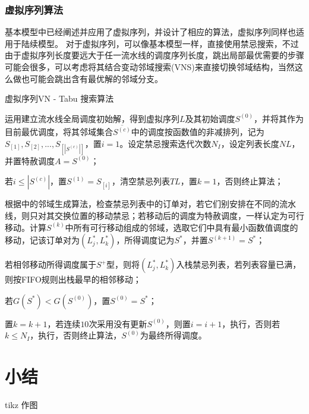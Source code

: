 \subsubsection{虚拟序列算法}
基本模型中已经阐述并应用了虚拟序列，并设计了相应的算法，虚拟序列同样也适用于陆续模型。
对于虚拟序列，可以像基本模型一样，直接使用禁忌搜索，不过由于虚拟序列长度要远大于任一流水线的调度序列长度，跳出局部最优需要的步骤可能会很多，可以考虑将其结合变动邻域搜索(VNS)来直接切换邻域结构，当然这么做也可能会跳出含有最优解的邻域分支。
\begin{algori}
虚拟序列VN - Tabu 搜索算法
\begin{asparaenum}
\renewcommand{\labelenumi}{\bf Step\theenumi~}
\item 运用建立流水线全局调度初始解，得到虚拟序列$L$及其初始调度$S^{(0)}$，并将其作为目前最优调度，将其邻域集合$\overline{S^{(c)}}$中的调度按函数值的非减排列，记为$S_{[1]},S_{[2]},...,S_{[|S^{(c)}|]}$，置$i = 1$。设定禁忌搜索迭代次数$N_I$，设定列表长度$NL$，并置特赦调度$A = S^{(0)}$；
\item 若$i \le |S^{(c)}|$，置$S^{(1)} = S_{[i]}$，清空禁忌列表$TL$，置$k = 1$，否则终止算法；
\item 根据中的邻域生成算法，检查禁忌列表中的订单对，若它们别安排在不同的流水线，则只对其交换位置的移动禁忌；若移动后的调度为特赦调度，一样认定为可行移动。计算$S^{(k)}$中所有可行移动组成的邻域，选取它们中具有最小函数值调度的移动，记该订单对为$(L_j^*, L_k^*)$，所得调度记为$S^*$，并置$S^{(k+1)} = S^*$；
\item 若相邻移动所得调度属于$S^+$型，则将$(L_j^*, L_k^*)$入栈禁忌列表，若列表容量已满，则按FIFO规则出栈最早的相邻移动；
\item 若$G(S^*) < G(S^{(0)})$，置$S^{(0)} = S^*$；
\item 置$k = k + 1$，若连续$10$次采用没有更新$S^{(0)}$，则置$i = i+1$，执行，否则若$k\le N_I$，执行，否则终止算法，$S^{(0)}$为最终所得调度。
\end{asparaenum}
\end{algori}
\section{小结}

tikz 作图
\begin{figure}[h]
\centering
{}
\end{figure}